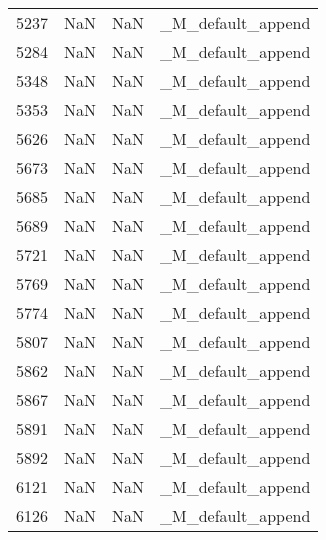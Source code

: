 \begin{tabular}{llll}
5237 &                   NaN &                        NaN &                         \_M\_default\_append \\
5284 &                   NaN &                        NaN &                         \_M\_default\_append \\
5348 &                   NaN &                        NaN &                         \_M\_default\_append \\
5353 &                   NaN &                        NaN &                         \_M\_default\_append \\
5626 &                   NaN &                        NaN &                         \_M\_default\_append \\
5673 &                   NaN &                        NaN &                         \_M\_default\_append \\
5685 &                   NaN &                        NaN &                         \_M\_default\_append \\
5689 &                   NaN &                        NaN &                         \_M\_default\_append \\
5721 &                   NaN &                        NaN &                         \_M\_default\_append \\
5769 &                   NaN &                        NaN &                         \_M\_default\_append \\
5774 &                   NaN &                        NaN &                         \_M\_default\_append \\
5807 &                   NaN &                        NaN &                         \_M\_default\_append \\
5862 &                   NaN &                        NaN &                         \_M\_default\_append \\
5867 &                   NaN &                        NaN &                         \_M\_default\_append \\
5891 &                   NaN &                        NaN &                         \_M\_default\_append \\
5892 &                   NaN &                        NaN &                         \_M\_default\_append \\
6121 &                   NaN &                        NaN &                         \_M\_default\_append \\
6126 &                   NaN &                        NaN &                         \_M\_default\_append \\

\end{tabular}
